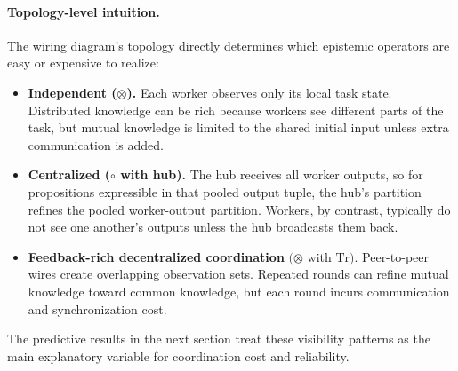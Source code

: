 \paragraph{Topology-level intuition.}
The wiring diagram's topology directly determines which epistemic operators are easy or expensive to
realize:
\begin{itemize}[leftmargin=*]
\item \textbf{Independent ($\otimes$).} Each worker observes only its local task state. Distributed
knowledge can be rich because workers see different parts of the task, but mutual knowledge is limited to
the shared initial input unless extra communication is added.
\item \textbf{Centralized ($\circ$ with hub).} The hub receives all worker outputs, so for propositions
expressible in that pooled output tuple, the hub's partition refines the pooled worker-output partition.
Workers, by contrast, typically do not see one another's outputs unless the hub broadcasts them back.
\item \textbf{Feedback-rich decentralized coordination} $(\otimes$ with $\mathrm{Tr})$. Peer-to-peer wires
create overlapping observation sets. Repeated rounds can refine mutual knowledge toward common knowledge,
but each round incurs communication and synchronization cost.
\end{itemize}
The predictive results in the next section treat these visibility patterns as the main explanatory
variable for coordination cost and reliability.

